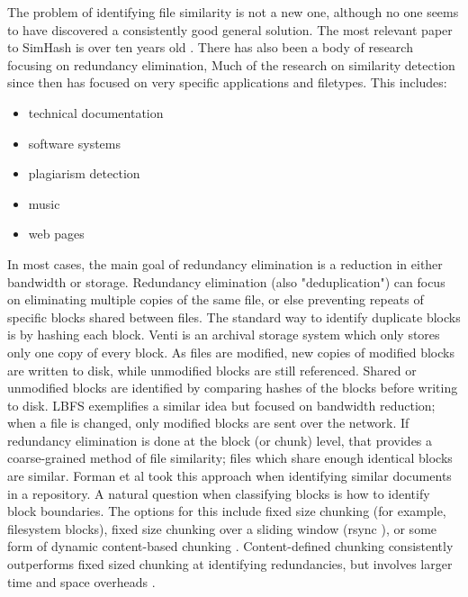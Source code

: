 \documentclass[10pt, twocolumn]{article}
\begin{document}
The problem of identifying file similarity is not a new one, although no one seems to have discovered a consistently good general solution. The most relevant paper to SimHash is over ten years old \cite{manber}. There has also been a body of research focusing on redundancy elimination, Much of the research on similarity detection since then has focused on very specific applications and filetypes. This includes:
\begin{itemize}
\item technical documentation \cite{hpDocRepositories} 
\item software systems \cite{sourcecode} 
\item plagiarism detection \cite{hoad} \cite{bernstein}
\item music \cite{music}
\item web pages \cite{buttler}
\end{itemize}

In most cases, the main goal of redundancy elimination is a reduction in either bandwidth or storage. Redundancy elimination (also "deduplication") can focus on eliminating multiple copies of the same file, or else preventing repeats of specific blocks shared between files. The standard way to identify duplicate blocks is by hashing each block. Venti \cite{venti} is an archival storage system which only stores only one copy of every block. As files are modified, new copies of modified blocks are written to disk, while unmodified blocks are still referenced. Shared or unmodified blocks are identified by comparing hashes of the blocks before writing to disk. LBFS \cite{lbfs} exemplifies a similar idea but focused on bandwidth reduction; when a file is changed, only modified blocks are sent over the network. If redundancy elimination is done at the block (or chunk) level, that provides a coarse-grained method of file similarity; files which share enough identical blocks are similar. Forman et al\cite{hpDocRepositories} took this approach when identifying similar documents in a repository. A natural question when classifying blocks is how to identify block boundaries. The options for this include fixed size chunking (for example, filesystem blocks), fixed size chunking over a sliding window (rsync \cite{rsync}), or some form of dynamic content-based chunking \cite{lbfs}. Content-defined chunking consistently outperforms fixed sized chunking at identifying redundancies, but involves larger time and space overheads  \cite{policroniades2004adr}.
\end{document}
